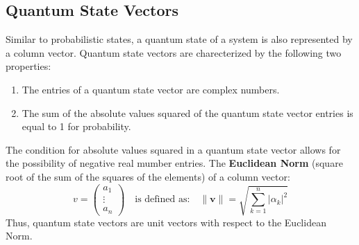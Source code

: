 \documentclass[11pt]{scrartcl}
\begin{document}
\subsection{Quantum State Vectors}
Similar to probabilistic states, a quantum state of a system is also represented by a column vector.
Quantum state vectors are charecterized by the following two properties:
\begin{enumerate}
	\item The entries of a quantum state vector are complex numbers.
	\item The sum of the absolute values squared of the quantum state vector entries is equal to 1 for probability.
\end{enumerate}
The condition for absolute values squared in a quantum state vector allows for the possibility of 
negative real mumber entries.\vspace{2mm}
\newline
The \textbf{Euclidean Norm} (square root of the sum of the squares of the elements) of a column vector: 
$$v = \begin{pmatrix}a_1 \\ \vdots \\ a_n\end{pmatrix} \quad\text{is defined as:}\quad \| \mathbf{v} \| = \sqrt{\sum_{k=1}^{n} |\alpha_k|^2}$$
Thus, quantum state vectors are unit vectors with respect to the Euclidean Norm.
\end{document}
